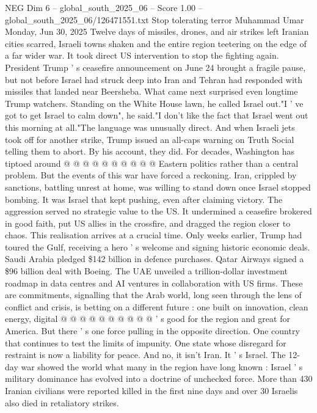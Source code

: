 \begin{textsample}{NEG Dim 6 – global\_south\_2025\_06 – Score 1.00 – global\_south\_2025\_06/126471551.txt}  \label{ex:f6_neg_446}
Stop tolerating terror Muhammad Umar Monday, Jun 30, 2025 Twelve days of missiles, drones, and air strikes left Iranian cities scarred, Israeli towns shaken and the entire region teetering on the edge of a far wider war.
It took direct US intervention to stop the fighting again.
President Trump ' s ceasefire announcement on June 24 brought a fragile pause, but not before Israel had struck deep into Iran and Tehran had responded with missiles that landed near Beersheba.
What came next surprised even longtime Trump watchers.
Standing on the White House lawn, he called Israel out."I ' ve got to get Israel to calm down", he said."I don't like the fact that Israel went out this morning at all."The language was unusually direct.
And when Israeli jets took off for another strike, Trump issued an all-caps warning on Truth Social telling them to abort.
By his account, they did.
For decades, Washington has tiptoed around @ @ @ @ @ @ @ @ @ @ Eastern politics rather than a central problem.
But the events of this war have forced a reckoning.
Iran, crippled by sanctions, battling unrest at home, was willing to stand down once Israel stopped bombing.
It was Israel that kept pushing, even after claiming victory.
The aggression served no strategic value to the US.
It undermined a ceasefire brokered in good faith, put US allies in the crossfire, and dragged the region closer to chaos.
This realisation arrives at a crucial time.
Only weeks earlier, Trump had toured the Gulf, receiving a hero ' s welcome and signing historic economic deals.
Saudi Arabia pledged \$142 billion in defence purchases.
Qatar Airways signed a \$96 billion deal with Boeing.
The UAE unveiled a trillion-dollar investment roadmap in data centres and AI ventures in collaboration with US firms.
These are commitments, signalling that the Arab world, long seen through the lens of conflict and crisis, is betting on a different future : one built on innovation, clean energy, digital @ @ @ @ @ @ @ @ @ @ ' s good for the region and great for America.
But there ' s one force pulling in the opposite direction.
One country that continues to test the limits of impunity.
One state whose disregard for restraint is now a liability for peace.
And no, it isn't Iran.
It ' s Israel.
The 12-day war showed the world what many in the region have long known : Israel ' s military dominance has evolved into a doctrine of unchecked force.
More than 430 Iranian civilians were reported killed in the first nine days and over 30 Israelis also died in retaliatory strikes.

\end{textsample}
